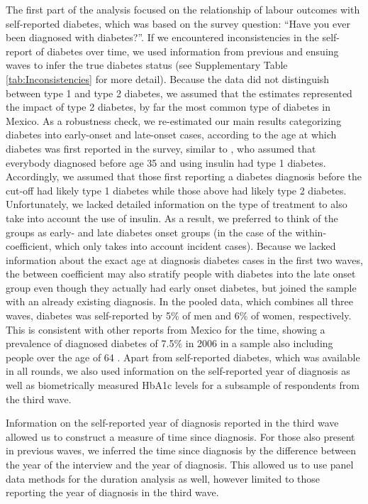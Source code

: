 \documentclass[12pt,english]{article}
\begin{document}
The first part of the analysis focused on the relationship of labour outcomes with self-reported diabetes, which was based on the survey question: “Have you ever been diagnosed with diabetes?”. If we encountered inconsistencies in the self-report of diabetes over time, we used information from previous and ensuing waves to infer the true diabetes status (see Supplementary Table \ref{tab:Inconsistencies} for more detail).  Because the data did not distinguish between type 1 and type 2 diabetes, we assumed that the estimates represented the impact of type 2 diabetes, by far the most common type of diabetes in Mexico. As a robustness check, we re-estimated our main results categorizing diabetes into early-onset and late-onset cases, according to the age at which diabetes was first reported in the survey, similar to \textcite{Alegre-Diaz2016}, who assumed that everybody diagnosed before age 35 and using insulin had type 1 diabetes. Accordingly, we assumed that those first reporting a diabetes diagnosis before the cut-off had likely type 1 diabetes while those above had likely type 2 diabetes. Unfortunately, we lacked detailed information on the type of treatment to also take into account the use of insulin. As a result, we preferred to think of the groups as early- and late diabetes onset groups (in the case of the within-coefficient, which only takes into account incident cases). Because we lacked information about the exact age at diagnosis diabetes cases in the first two waves, the between coefficient may also stratify people with diabetes into the late onset group even though they actually had early onset diabetes, but joined the sample with an already existing diagnosis. In the pooled data, which combines all three waves, diabetes was self-reported by 5\% of men and 6\% of women, respectively. This is consistent with other reports from Mexico for the time, showing a prevalence of diagnosed diabetes of 7.5\% in 2006 in a sample also including people over the age of 64 \parencite{Barquera2013}. Apart from self-reported diabetes, which was available in all rounds, we also used information on the self-reported year of diagnosis as well as biometrically measured \ac{HbA1c} levels for a subsample of respondents from the third wave.

Information on the self-reported year of diagnosis reported in the third wave allowed us to construct a measure of time since diagnosis. For those also present in previous waves, we inferred the time since diagnosis by the difference between the year of the interview and the year of diagnosis. This allowed us to use panel data methods for the duration analysis as well, however limited to those reporting the year of diagnosis in the third wave. 
\end{document}
